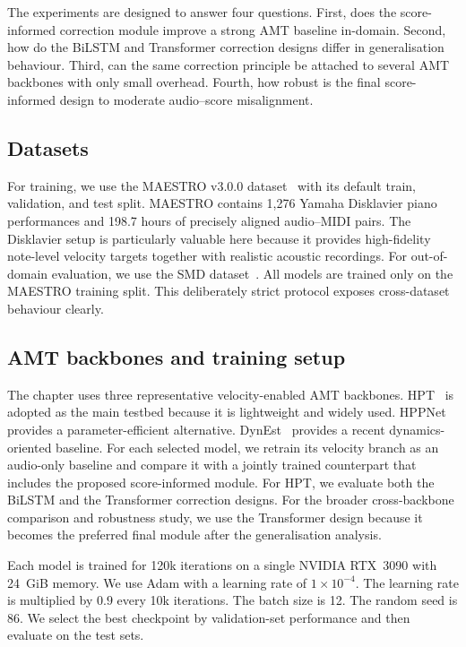 The experiments are designed to answer four questions. First, does the score-informed correction module improve a strong AMT baseline in-domain. Second, how do the BiLSTM and Transformer correction designs differ in generalisation behaviour. Third, can the same correction principle be attached to several AMT backbones with only small overhead. Fourth, how robust is the final score-informed design to moderate audio--score misalignment.

\subsection{Datasets}
\label{sec:scoreinf:datasets}

For training, we use the MAESTRO v3.0.0 dataset~\cite{hawthorne2019maestro} with its default train, validation, and test split. MAESTRO contains 1,276 Yamaha Disklavier piano performances and 198.7 hours of precisely aligned audio--MIDI pairs. The Disklavier setup is particularly valuable here because it provides high-fidelity note-level velocity targets together with realistic acoustic recordings. For out-of-domain evaluation, we use the SMD dataset~\cite{smd}. All models are trained only on the MAESTRO training split. This deliberately strict protocol exposes cross-dataset behaviour clearly.

\subsection{AMT backbones and training setup}
\label{sec:scoreinf:training}

The chapter uses three representative velocity-enabled AMT backbones. HPT~\cite{kong2021hpt} is adopted as the main testbed because it is lightweight and widely used. HPPNet~\cite{wei2022hppnet} provides a parameter-efficient alternative. DynEst~\cite{he2026dynest} provides a recent dynamics-oriented baseline. For each selected model, we retrain its velocity branch as an audio-only baseline and compare it with a jointly trained counterpart that includes the proposed score-informed module. For HPT, we evaluate both the BiLSTM and the Transformer correction designs. For the broader cross-backbone comparison and robustness study, we use the Transformer design because it becomes the preferred final module after the generalisation analysis.

Each model is trained for 120k iterations on a single NVIDIA RTX~3090 with 24~GiB memory. We use Adam with a learning rate of $1\times10^{-4}$. The learning rate is multiplied by $0.9$ every 10k iterations. The batch size is 12. The random seed is 86. We select the best checkpoint by validation-set performance and then evaluate on the test sets.

